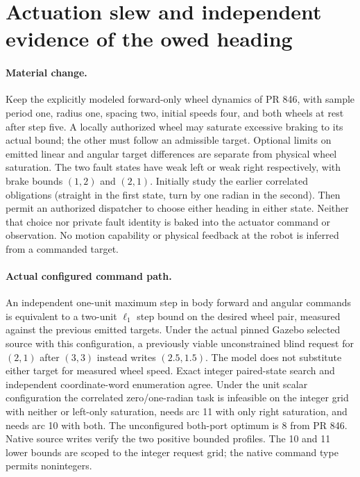 \documentclass{article}
\begin{document}
\section*{Actuation slew and independent evidence of the owed heading}
\paragraph{Material change.}
Keep the explicitly modeled forward-only wheel dynamics of PR 846,
with sample period one, radius one, spacing two, initial speeds four,
and both wheels at rest after step five. A locally authorized wheel
may saturate excessive braking to its actual bound; the other must
follow an admissible target. Optional limits on emitted linear and angular
target differences are separate from physical wheel saturation.
The two fault states have weak left or weak right respectively,
with brake bounds \((1,2)\) and \((2,1)\).
Initially study the earlier correlated obligations (straight in the
first state, turn by one radian in the second). Then permit an
authorized dispatcher to choose either heading in either state.
Neither that choice nor private fault identity is baked into
the actuator command or observation. No motion capability or
physical feedback at the robot is inferred from a commanded target.

\paragraph{Actual configured command path.}
An independent one-unit maximum step in body forward and angular
commands is equivalent to a two-unit \(\ell_1\) step bound on
the desired wheel pair, measured against the previous emitted
targets. Under the actual pinned Gazebo selected source with this
configuration, a previously viable unconstrained blind request for
\((2,1)\) after \((3,3)\) instead writes \((2.5,1.5)\).
The model does not substitute either target for measured wheel speed.
Exact integer paired-state search and independent coordinate-word
enumeration agree. Under the unit scalar configuration the correlated
zero/one-radian task is infeasible on the integer grid with neither
or left-only saturation, needs arc 11 with only right saturation,
and needs arc 10 with both. The unconfigured both-port optimum is
8 from PR 846. Native source writes verify the two positive
bounded profiles. The 10 and 11 lower bounds are scoped to the
integer request grid; the native command type permits nonintegers.
\end{document}
